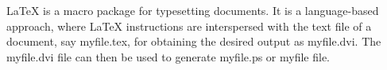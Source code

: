 \documentclass{article}
\begin{document}
LaTeX is a macro package for typesetting documents. It
is a language-based approach, where LaTeX instructions
are interspersed with the text file of a document, say
myfile.tex, for obtaining the desired output as
myfile.dvi. The myfile.dvi file can then be used to
generate myfile.ps or myfile file.
\end{document}
